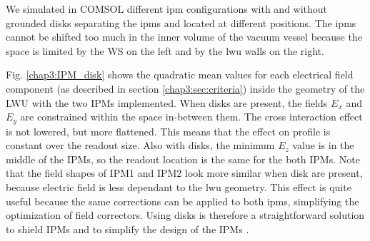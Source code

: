 \begin{refsection}
  We simulated in COMSOL different \acrshort{ipm} configurations with and without grounded disks separating the \acrshort{ipm}s and located at different positions. The \acrshort{ipm}s cannot be shifted too much in the inner volume of the vacuum vessel because the space is limited by the WS on the left and by the \acrshort{lwu} walls on the right. 
  
  Fig. \ref{chap3:IPM_disk} shows the quadratic mean values for each electrical field component (as described in section \ref{chap3:sec:criteria}) inside the geometry of the LWU with the two IPMs implemented. When disks are present, the fields $E_{x}$ and $E_{y}$ are constrained within the space in-between them. The cross interaction effect is not lowered, but more flattened. This means that the effect on profile is constant over the readout size. 
  Also with disks, the minimum $E_{z}$ value is in the middle of the IPMs, so the readout location is the same for the both IPMs.
  Note that the field shapes of IPM1 and IPM2 look more similar when disk are present, because electric field is less dependant to the \acrshort{lwu} geometry. This effect is quite useful because the same corrections can be applied to both \acrshort{ipm}s, simplifying the optimization of field correctors. Using disks is therefore a straightforward solution to shield IPMs and to simplify the design of the IPMs .
  

  
  \vspace{1cm}



\end{refsection}
